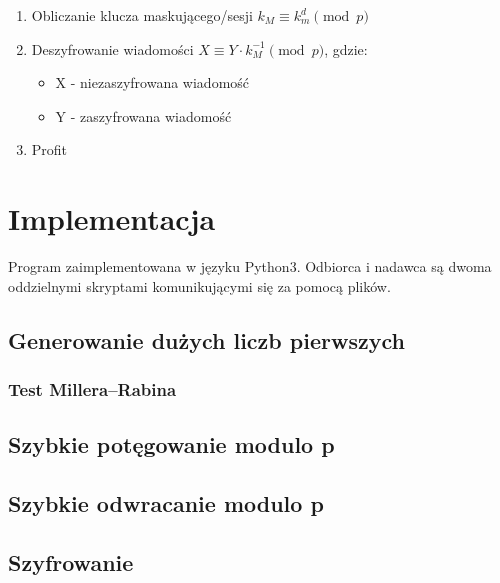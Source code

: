 \documentclass{article}
\begin{document}
\begin{enumerate}
        \begin{enumerate}
            \item Obliczanie klucza maskującego/sesji $ k_M \equiv k_m ^ {d} \pmod p $
            \item Deszyfrowanie wiadomości $X \equiv Y \cdot k_M^{-1} \pmod p$, gdzie:
            \begin{itemize}
                \item X - niezaszyfrowana wiadomość
                \item Y - zaszyfrowana wiadomość
            \end{itemize}
            \item Profit
        \end{enumerate}
    \end{enumerate}
    \section{Implementacja}
    Program zaimplementowana w języku Python3. 
    Odbiorca i nadawca są dwoma oddzielnymi skryptami komunikującymi się za pomocą plików. 
    \subsection{Generowanie dużych liczb pierwszych}
    \subsubsection{Test Millera--Rabina}
    \subsection{Szybkie potęgowanie modulo p}
    \subsection{Szybkie odwracanie modulo p }
    \subsection{Szyfrowanie}
    
\end{document}
